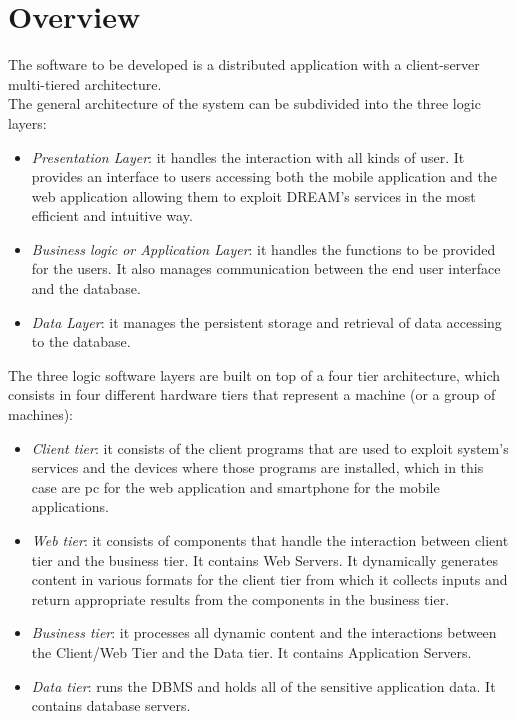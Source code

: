 \section{Overview}

The software to be developed is a distributed application with a client-server multi-tiered architecture. \\
The general architecture of the system can be subdivided into the three logic layers:
\begin{itemize}
    \item \textit{Presentation Layer}: it handles the interaction with all kinds of user. It provides an interface to users accessing both the mobile application and the web application allowing them to exploit DREAM’s services in the most efficient and intuitive way. 
    \item \textit{Business logic or Application Layer}: it handles the functions to be provided for the users. It also manages communication between the end user interface and the database. 
    \item \textit{Data Layer}: it manages the persistent storage and retrieval of data accessing to the database. 
\end{itemize}

The three logic software layers are built on top of a four tier architecture, which consists in four different hardware tiers that represent a machine (or a group of machines):
\begin{itemize}
    \item \textit{Client tier}: it consists of the client programs that are used to exploit system’s services and the devices where those programs are installed, which in this case are pc for the web application and smartphone for the mobile applications.
    \item \textit{Web tier}: it consists of components that handle the interaction between client tier and the business tier. It contains Web Servers. It dynamically generates content in various formats for the client tier from which it collects inputs and return appropriate results from the components in the business tier.
    \item \textit{Business tier}: it processes all dynamic content and the interactions between the Client/Web Tier and the Data tier. It contains Application Servers.
    \item \textit{Data tier}: runs the DBMS and holds all of the sensitive application data. It contains database servers.
\end{itemize}

